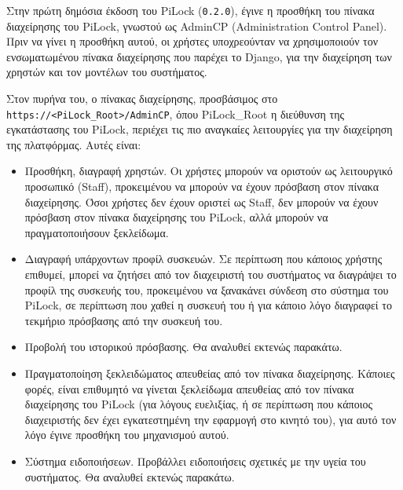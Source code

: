 Στην πρώτη δημόσια έκδοση του PiLock (\verb|0.2.0|), έγινε η προσθήκη του πίνακα διαχείρησης του PiLock, γνωστού ως AdminCP (Administration Control Panel). Πριν να γίνει η προσθήκη αυτού, οι χρήστες υποχρεούνταν να χρησιμοποιούν τον ενσωματωμένου πίνακα διαχείρησης που παρέχει το Django, για την διαχείρηση των χρηστών και τον μοντέλων του συστήματος.

Στον πυρήνα του, ο πίνακας διαχείρησης, προσβάσιμος στο \verb|https://<PiLock_Root>/AdminCP|, όπου PiLock\_Root η διεύθυνση της εγκατάστασης του PiLock, περιέχει τις πιο αναγκαίες λειτουργίες για την διαχείρηση της πλατφόρμας. Αυτές είναι:

\begin{itemize}
	\item Προσθήκη, διαγραφή χρηστών. Οι χρήστες μπορούν να οριστούν ως λειτουργικό προσωπικό (Staff), προκειμένου να μπορούν να έχουν πρόσβαση στον πίνακα διαχείρησης. Όσοι χρήστες δεν έχουν οριστεί ως Staff, δεν μπορούν να έχουν πρόσβαση στον πίνακα διαχείρησης του PiLock, αλλά μπορούν να πραγματοποιήσουν ξεκλείδωμα.
	\item Διαγραφή υπάρχοντων προφίλ συσκευών. Σε περίπτωση που κάποιος χρήστης επιθυμεί, μπορεί να ζητήσει από τον διαχειριστή του συστήματος να διαγράψει το προφίλ της συσκευής του, προκειμένου να ξανακάνει σύνδεση στο σύστημα του PiLock, σε περίπτωση που χαθεί η συσκευή του ή για κάποιο λόγο διαγραφεί το τεκμήριο πρόσβασης από την συσκευή του.
	\item Προβολή του ιστορικού πρόσβασης. Θα αναλυθεί εκτενώς παρακάτω.
	\item Πραγματοποίηση ξεκλειδώματος απευθείας από τον πίνακα διαχείρησης. Κάποιες φορές, είναι επιθυμητό να γίνεται ξεκλείδωμα απευθείας από τον πίνακα διαχείρησης του PiLock (για λόγους ευελιξίας, ή σε περίπτωση που κάποιος διαχειριστής δεν έχει εγκατεστημένη την εφαρμογή στο κινητό του), για αυτό τον λόγο έγινε προσθήκη του μηχανισμού αυτού.  %
	\item Σύστημα ειδοποιήσεων. Προβάλλει ειδοποιήσεις σχετικές με την υγεία του συστήματος. Θα αναλυθεί εκτενώς παρακάτω.
\end{itemize}